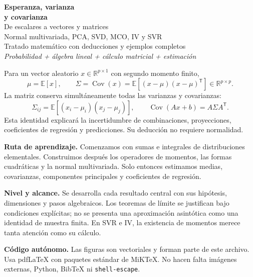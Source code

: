 \documentclass[11pt,a4paper]{article}
\newcommand{\R}{\mathbb R}
\newcommand{\E}{\mathbb E}
\newcommand{\T}{^{\mathsf T}}
\DeclareMathOperator{\Cov}{Cov}
\theoremstyle{definition}\newtheorem{definicion}[teorema]{Definición}
\begin{document}
\thispagestyle{empty}
\begin{center}
{\Huge\bfseries\color{azul}Esperanza, varianza\\[3pt]y covarianza}\\[10pt]
{\LARGE De escalares a vectores y matrices}\\[7pt]
{\Large Normal multivariada, PCA, SVD, MCO, IV y SVR}\\[8pt]
{\large Tratado matemático con deducciones y ejemplos completos}\\[4pt]
\textit{Probabilidad + álgebra lineal + cálculo matricial + estimación}
\end{center}
\begin{idea}
Para un vector aleatorio $x\in\R^{p\times1}$ con segundo momento finito,
\[
\mu=\E[x],\qquad
\boxed{\Sigma=\Cov(x)=\E[(x-\mu)(x-\mu)\T]\in\R^{p\times p}}.
\]
La matriz conserva simultáneamente todas las varianzas y covarianzas:
\[
\Sigma_{ij}=\E[(x_i-\mu_i)(x_j-\mu_j)],\qquad
\boxed{\Cov(Ax+b)=A\Sigma A\T}.
\]
Esta identidad explicará la incertidumbre de combinaciones, proyecciones,
coeficientes de regresión y predicciones. Su deducción no requiere normalidad.
\end{idea}
\begin{center}
\end{center}
\textbf{Ruta de aprendizaje.} Comenzamos con sumas e integrales de distribuciones
elementales. Construimos después los operadores de momentos, las formas
cuadráticas y la normal multivariada. Solo entonces estimamos medias,
covarianzas, componentes principales y coeficientes de regresión.

\textbf{Nivel y alcance.} Se desarrolla cada resultado central con sus
hipótesis, dimensiones y pasos algebraicos. Los teoremas de límite se
justifican bajo condiciones explícitas; no se presenta una aproximación
asintótica como una identidad de muestra finita. En SVR e IV, la existencia
de momentos merece tanta atención como su cálculo.

\textbf{Código autónomo.} Las figuras son vectoriales y forman parte de este
archivo. Usa pdfLaTeX con paquetes estándar de MiKTeX. No hacen falta
imágenes externas, Python, Bib\TeX{} ni \texttt{shell-escape}.
\clearpage
\end{document}
